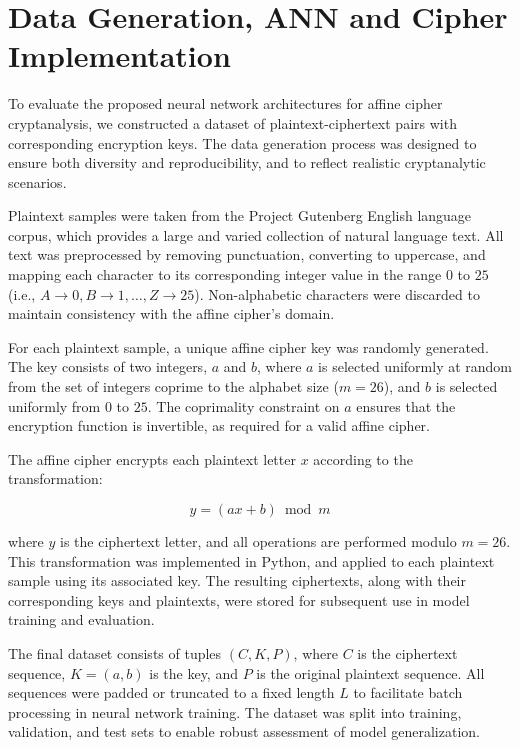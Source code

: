 \documentclass[manuscript,screen,acmtog,natbib=false]{acmart}
\begin{document}
  \section{Data Generation, ANN and Cipher Implementation}

  To evaluate the proposed neural network architectures for affine cipher cryptanalysis, we constructed a dataset of
  plaintext-ciphertext pairs with corresponding encryption keys. The data generation process was designed to ensure both diversity and 
  reproducibility, and to reflect realistic cryptanalytic scenarios.

  Plaintext samples were taken from the Project Gutenberg English language corpus, which provides a large and varied collection of 
  natural language text. All text was preprocessed by removing punctuation, converting to uppercase, and mapping each character to its 
  corresponding integer value in the range \(0\) to \(25\) (i.e., \(A \rightarrow 0, B \rightarrow 1, \ldots, Z \rightarrow 25\)). Non-alphabetic 
  characters were discarded to maintain consistency with the affine cipher's domain.
  
  For each plaintext sample, a unique affine cipher key was randomly generated. The key consists of two integers, \(a\) and \(b\),
  where \(a\) is selected uniformly at random from the set of integers coprime to the alphabet size (\(m = 26\)), and \(b\) is selected
  uniformly from \(0\) to \(25\). The coprimality constraint on \(a\) ensures that the encryption function is invertible, as 
  required for a valid affine cipher.

  The affine cipher encrypts each plaintext letter \(x\) according to the transformation:

  \[y = (a x + b) \bmod m\]

  where \(y\) is the ciphertext letter, and all operations are performed modulo \(m = 26\). This transformation was implemented
  in Python, and applied to each plaintext sample using its associated key. The resulting ciphertexts, along with their corresponding 
  keys and plaintexts, were stored for subsequent use in model training and evaluation.

  The final dataset consists of tuples \((C, K, P)\), where \(C\) is the ciphertext sequence, \(K = (a, b)\) is the key, and \(P\) is
  the original plaintext sequence. All sequences were padded or truncated to a fixed length \(L\) to facilitate batch processing in 
  neural network training. The dataset was split into training, validation, and test sets to enable robust assessment of model generalization.
\end{document}
